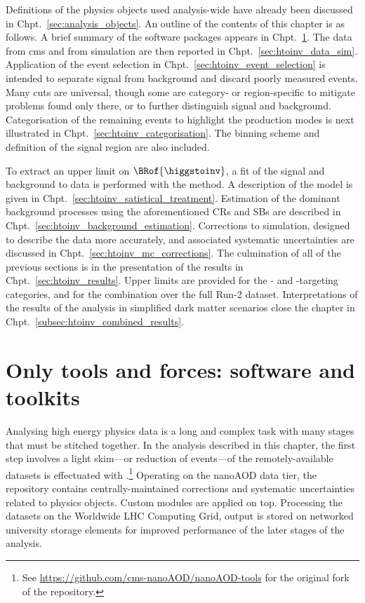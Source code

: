 Definitions of the physics objects used analysis-wide have already been discussed in Chpt.~\ref{sec:analysis_objects}. An outline of the contents of this chapter is as follows. A brief summary of the software packages appears in Chpt.~\ref{sec:htoinv_software}. The data from \acrshort{cms} and from simulation are then reported in Chpt.~\ref{sec:htoinv_data_sim}. Application of the event selection in Chpt.~\ref{sec:htoinv_event_selection} is intended to separate signal from background and discard poorly measured events. Many cuts are universal, though some are category- or region-specific to mitigate problems found only there, or to further distinguish signal and background. Categorisation of the remaining events to highlight the production modes is next illustrated in Chpt.~\ref{sec:htoinv_categorisation}. The binning scheme and definition of the signal region are also included.

To extract an upper limit on $\BRof{\higgstoinv}$, a fit of the signal and background to data is performed with the \CLs method. A description of the model is given in Chpt.~\ref{sec:htoinv_satistical_treatment}. Estimation of the dominant background processes using the aforementioned \glspl{CR} and \glspl{SB} are described in Chpt.~\ref{sec:htoinv_background_estimation}. Corrections to simulation, designed to describe the data more accurately, and associated systematic uncertainties are discussed in Chpt.~\ref{sec:htoinv_mc_corrections}. The culmination of all of the previous sections is in the presentation of the results in Chpt.~\ref{sec:htoinv_results}. Upper limits are provided for the \ttH- and \VH-targeting categories, and for the combination over the full Run-2 dataset. Interpretations of the results of the analysis in simplified dark matter scenarios close the chapter in Chpt.~\ref{subsec:htoinv_combined_results}.




\section{Only tools and forces: software and toolkits}
\label{sec:htoinv_software}

Analysing high energy physics data is a long and complex task with many stages that must be stitched together. In the analysis described in this chapter, the first step involves a light skim---or reduction of events---of the remotely-available datasets is effectuated with \nanoAODtools.\footnote{See \url{https://github.com/cms-nanoAOD/nanoAOD-tools} for the original fork of the repository.} Operating on the nanoAOD data tier, the repository contains centrally-maintained corrections and systematic uncertainties related to physics objects. Custom modules are applied on top. Processing the datasets on the Worldwide LHC Computing Grid, output is stored on networked university storage elements for improved performance of the later stages of the analysis.

